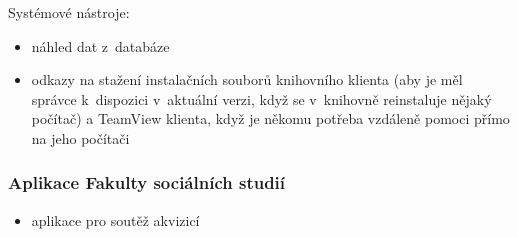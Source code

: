 \documentclass[
	11pt, oneside, printed, final, palatino, monochrome
	microtype,
	table,   %
	lof,     %
	lot     %
]{fithesis3}
\begin{document}
{Systémové nástroje:

\begin{itemize}
\item náhled dat z~databáze
\item odkazy na stažení instalačních souborů knihovního klienta (aby je měl správce k~dispozici v~aktuální verzi, když se v~knihovně reinstaluje nějaký počítač) a TeamView klienta, když je někomu potřeba vzdáleně pomoci přímo na jeho počítači
\end{itemize}

\subsubsection{Aplikace Fakulty sociálních studií}

\begin{itemize}
\item aplikace pro soutěž akvizicí
\end{itemize}

}
\end{document}
